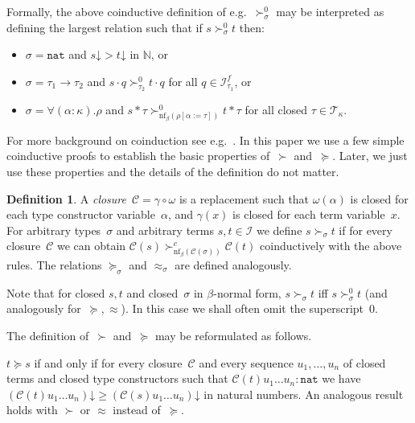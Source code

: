 \documentclass[a4paper,UKenglish,cleveref,autoref,numberwithinsect]{lipics-v2019}
\theoremstyle{definition}
\newtheorem{defn}[theorem]{Definition}
\newcommand{\Iterms}{\mathcal{I}}
\newcommand{\arrtype}{\rightarrow}
\newcommand{\app}[2]{#1 \cdot #2}
\newcommand{\tapp}[2]{#1 * #2}
\newcommand{\subst}[2]{#1:=#2}
\newcommand{\nat}{\mathtt{nat}}
\newcommand{\Tc}{\mathcal{T}}
\newcommand{\cl}{\mathcal{C}}
\newcommand{\nf}{\mathrm{nf}}
\newcommand{\da}{\mathord{\downarrow}}
\begin{document}
Formally, the above coinductive definition of e.g.~$\succ_\sigma^0$
may be interpreted as defining the largest relation such that if $s
\succ_\sigma^0 t$ then:
\begin{itemize}
\item $\sigma = \nat$ and $s\da > t\da$ in $\mathbb{N}$, or
\item $\sigma = \tau_1\arrtype\tau_2$ and
  $\app{s}{q} \succ_{\tau_2}^0 \app{t}{q}$ for all
  $q \in \Iterms^f_{\tau_1}$, or
\item $\sigma = \forall(\alpha:\kappa).\rho$ and
  $\tapp{s}{\tau} \succ_{\nf_\beta(\rho[\subst{\alpha}{\tau}])}^0
  \tapp{t}{\tau}$ for all closed $\tau \in \Tc_{\kappa}$.
\end{itemize}
For more background on coinduction see
e.g.~\cite{KozenSilva2017,Sangiorgi2012,JacobsRutten2011}. In this
paper we use a few simple coinductive proofs to establish the basic
properties of~$\succ$ and~$\succeq$. Later, we just use these
properties and the details of the definition do not matter.

\begin{defn}\label{def_closure}
  A \emph{closure}~$\cl = \gamma \circ \omega$ is a
  replacement such that $\omega(\alpha)$ is closed for each
  type constructor variable~$\alpha$, and $\gamma(x)$ is closed for
  each term variable~$x$.
  For arbitrary types~$\sigma$ and arbitrary terms $s,t \in \Iterms$
  we define $s \succ_\sigma t$ if for every closure~$\cl$ we can
  obtain $\cl(s) \succ_{\nf_\beta(\cl(\sigma))}^c \cl(t)$
  coinductively with the above rules. The relations $\succeq_\sigma$
  and $\approx_\sigma$ are defined analogously.
\end{defn}

Note that for closed $s,t$ and closed~$\sigma$ in $\beta$-normal form,
$s \succ_\sigma t$ iff $s \succ_\sigma^0 t$ (and analogously
for~$\succeq,\approx$). In this case we shall often omit the
superscript~$0$.

The definition of~$\succ$ and~$\succeq$ may be reformulated as
follows.

\begin{lemma}\label{lem_succ_explicit}
  $t \succeq s$ if and only if for every closure~$\cl$ and every
  sequence $u_1,\ldots,u_n$ of closed terms and closed type
  constructors such that $\cl(t) u_1 \ldots u_n : \nat$ we have
  $(\cl(t) u_1 \ldots u_n)\da \ge (\cl(s) u_1 \ldots u_n)\da$ in
  natural numbers. An analogous result holds with $\succ$ or $\approx$
  instead of~$\succeq$.
\end{lemma}
\end{document}
